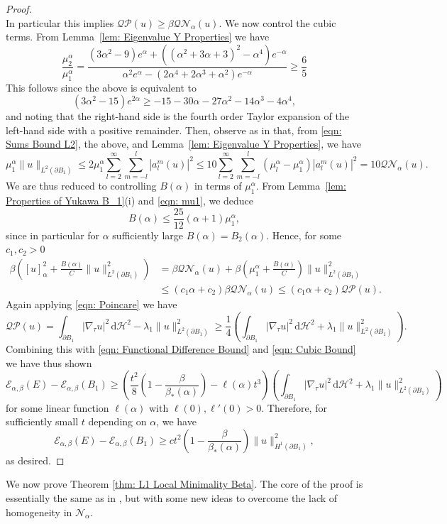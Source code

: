 \documentclass[a4paper,11pt,reqno]{amsart}
\numberwithin{equation}{section}
\theoremstyle{remark}
\theoremstyle{definition}
\newcommand{\dd}{\,\mathrm{d}}
\newcommand{\ene}{\mathcal{E}_{\alpha,\beta}}
\newcommand{\nl}{\mathcal{N}_{\alpha}}
\renewcommand{\leq}{\leqslant}
\renewcommand{\geq}{\geqslant}
\begin{document}
\begin{proof}
\begin{equation}
	\end{equation}
In particular this implies $\mathcal{QP}(u)\geq \beta \mathcal{QN}_{\alpha}(u)$. We now control the cubic terms. From Lemma~\ref{lem: Eigenvalue Y Properties} we have
	\[
		\frac{\mu_2^{\alpha}}{\mu_1^{\alpha}} = \frac{(3\alpha^2-9)e^{\alpha} + \left((\alpha^2+3\alpha+3)^2-\alpha^4\right)e^{-\alpha}}{\alpha^2e^{\alpha}-(2\alpha^4+2\alpha^3+\alpha^2)e^{-\alpha}} \geq \frac{6}{5} 
	\]
This follows since the above is equivalent to
	\[
		(3\alpha^2-15)e^{2\alpha} \geq -15-30\alpha-27\alpha^2-14\alpha^3-4\alpha^4,
	\]
and noting that the right-hand side is the fourth order Taylor expansion of the left-hand side with a positive remainder. Then, observe as in \cite[Eq. (8.9)]{FFMMM} that, from \eqref{eqn: Sums Bound L2}, the above, and Lemma~\ref{lem: Eigenvalue Y Properties}, we have
	\[
\mu_1^{\alpha}\|u\|_{L^2(\partial B_1)} \leq 2\mu_1^{\alpha}\sum_{l=2}^{\infty}\sum_{m=-l}^l|a_l^m(u)|^2 \leq 10\sum_{l=2}^{\infty}\sum_{m=-l}^l(\mu_l^{\alpha}-\mu_1^{\alpha})|a_l^m(u)|^2 = 10\mathcal{QN}_{\alpha}(u).
	\]
We are thus reduced to controlling $B(\alpha)$ in terms of $\mu_1^{\alpha}$. From Lemma~\ref{lem: Properties of Yukawa B_1}(i) and \eqref{eqn: mu1}, we deduce
	\[
		B(\alpha) \leq \frac{25}{12}(\alpha+1)\mu_1^{\alpha},
	\]
since in particular for $\alpha$ sufficiently large $B(\alpha)=B_2(\alpha)$. Hence, for some $c_1,c_2>0$
	\begin{align}\label{eqn: Cubic Bound}
		\beta \left([u]_{\alpha}^2+\frac{B(\alpha)}{C} \|u\|_{L^2(\partial B_1)}^2\right) &= \beta\mathcal{QN}_{\alpha}(u)+\beta \left(\mu_1^{\alpha}+\frac{B(\alpha)}{C}\right) \|u\|_{L^2(\partial B_1)}^2\nonumber \\
					&\leq  \left(c_1\alpha+c_2\right)\beta \mathcal{QN}_{\alpha}(u) \leq  \left(c_1\alpha+c_2\right)\mathcal{QP}(u).
	\end{align}
Again applying \eqref{eqn: Poincare} we have
	\[
	\mathcal{QP}(u) = \int_{\partial B_1} |\nabla_{\tau} u|^2 \dd \mathcal{H}^2-\lambda_1 \|u\|_{L^2(\partial B_1)}^2 \geq \frac{1}{4}\left(\int_{\partial B_1} |\nabla_{\tau} u|^2 \dd \mathcal{H}^2+\lambda_1 \|u\|_{L^2(\partial B_1)}^2\right).
	\]
Combining this with \eqref{eqn: Functional Difference Bound} and \eqref{eqn: Cubic Bound} we have thus shown
	\[
		\ene(E)-\ene(B_1)  
				\geq \left(\frac{t^2}{8}\left(1-\frac{\beta}{\beta_*(\alpha)}\right)-\ell(\alpha)t^3\right)\left(\int_{\partial B_1}|\nabla_{\tau} u|^2 \dd\mathcal{H}^2 + \lambda_1 \|u\|_{L^2(\partial B_1)}^2\right)
	\]
for some linear function $\ell(\alpha)$ with $\ell(0), \ell'(0)>0$. Therefore, for sufficiently small $t$ depending on $\alpha$, we have
	\[
		\ene(E)-\ene(B_1)\geq ct^2\left(1-\frac{\beta}{\beta_*(\alpha)}\right)\|u\|_{H^1(\partial B_1)}^2,
	\]
as desired.
\end{proof}
We now prove Theorem \ref{thm: L1 Local Minimality Beta}. The core of the proof is essentially the same as in \cite[Lemma 8.5]{FFMMM}, but with some new ideas to overcome the lack of homogeneity in $\nl$.
\end{document}

